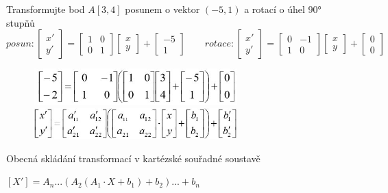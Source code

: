 Transformujte bod $A[3,4]$ posunem o vektor $(-5,1)$ a rotací o úhel $\ang{90}$ stupňů
	\begin{equation*}
posun:
 \begin{bmatrix}     
 x'   \\[0.3em]      
 y'
 \end{bmatrix} = 
 \begin{bmatrix}
     1 & 0     \\[0.3em]
     0 & 1        
  \end{bmatrix}
  \begin{bmatrix}
     x     \\[0.3em]
     y        
     \end{bmatrix} +
      \begin{bmatrix}
     -5     \\[0.3em]
     1        
     \end{bmatrix} \qquad rotace:
	 \begin{bmatrix}     
	 x'   \\[0.3em]      
	 y'
	 \end{bmatrix} = 
	 \begin{bmatrix}
	     0 & -1     \\[0.3em]
	     1 & 0        
	  \end{bmatrix}
	  \begin{bmatrix}
	     x     \\[0.3em]
	     y        
	     \end{bmatrix} +
	      \begin{bmatrix}
	     0     \\[0.3em]
	     0        
	     \end{bmatrix}
\end{equation*}
\begin{figure}[H]
\centering
\includegraphics[width=0.7\textwidth]{assets/2_skladani}
\includegraphics[width=0.7\textwidth]{assets/2_skladani2}
\end{figure}
Obecná skládání transformací v kartézské souřadné soustavě 
\begin{center}
$[X'] = A_n ...(A_2(A_1 \cdot X + b_1) + b_2) ... + b_n$
\end{center}

